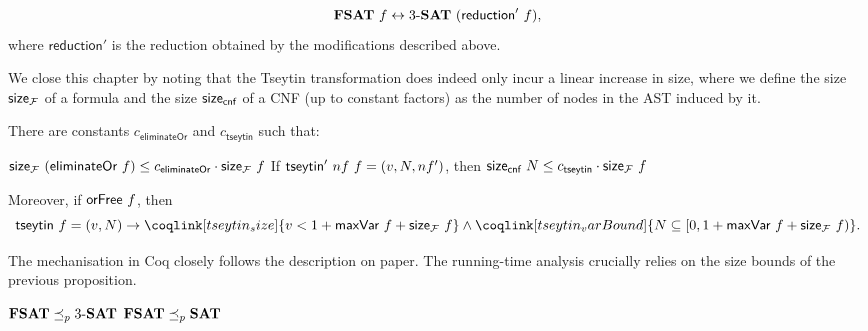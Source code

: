\begin{lemma}
  \[\textbf{FSAT}{}~f \leftrightarrow \text{3-\textbf{SAT}{}}~(\textsf{reduction}'~f), \]
  where $\textsf{reduction}'$ is the reduction obtained by the modifications described above.
\end{lemma}

We close this chapter by noting that the Tseytin transformation does indeed only incur a linear increase in size, where we define the size $\textsf{size}_{\mathcal{F}}$ of a formula and the size $\textsf{size}_{\textsf{cnf}}$ of a CNF (up to constant factors) as the number of nodes in the AST induced by it. 

\begin{proposition}
  There are constants $c_{\textsf{eliminateOr}}$ and $c_{\textsf{tseytin}}$ such that:
  \begin{enumerate}
     $\textsf{size}_{\mathcal{F}}~(\textsf{eliminateOr}{}~f) \le c_{\textsf{eliminateOr}} \cdot \textsf{size}_{\mathcal{F}}~f$
     If $\textsf{tseytin}'~nf~f = (v, N, nf')$, then $\textsf{size}_{\textsf{cnf}}~N \le c_{\textsf{tseytin}} \cdot \textsf{size}_{\mathcal{F}}~f$
  \end{enumerate}
  Moreover, if $\textsf{orFree}~f$, then
  \[\tseytin~f = (v, N) \rightarrow \coqlink[tseytin_size]{v < \natS{\maxVar~f} + \textsf{size}_{\formula}~f} \land \coqlink[tseytin_varBound]{N \subseteq [0, \natS{\maxVar~f} + \textsf{size}_{\formula}~f)}. \]
\end{proposition}

The mechanisation in Coq closely follows the description on paper. The running-time analysis crucially relies on the size bounds of the previous proposition.
\begin{theorem}\leavevmode
  \begin{enumerate}
     $\textbf{FSAT}{} \preceq_p{} \text{3-\textbf{SAT}{}}$
     $\textbf{FSAT}{} \preceq_p{} \textbf{SAT}{}$
  \end{enumerate}
\end{theorem}
